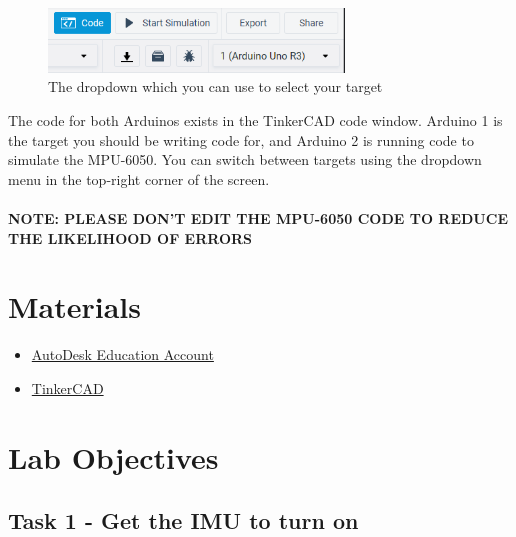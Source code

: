 \documentclass{article}
\begin{document}
        \begin{figure}[ht]
            \centering
            \includegraphics[width = 0.7\textwidth]{img/TinkerCadCode.PNG}
            \caption{The dropdown which you can use to select your target}
        \end{figure}
        
        The code for both Arduinos exists in the TinkerCAD code window. Arduino 1 is the target you should be writing code for, and Arduino 2 is running code to simulate the MPU-6050. You can switch between targets using the dropdown menu in the top-right corner of the screen. 
        \\ \\
        \textbf{NOTE: PLEASE DON'T EDIT THE MPU-6050 CODE TO REDUCE THE LIKELIHOOD OF ERRORS}
        
\section{Materials}
\begin{itemize}
	\item \href{https://www.autodesk.com/education/edu-software/overview}{AutoDesk Education Account}
	\item \href{https://www.tinkercad.com/things/16XnuyNUjCb}{TinkerCAD}
\end{itemize}

\section{Lab Objectives}
    \subsection{Task 1 - Get the IMU to turn on}
\end{document}
